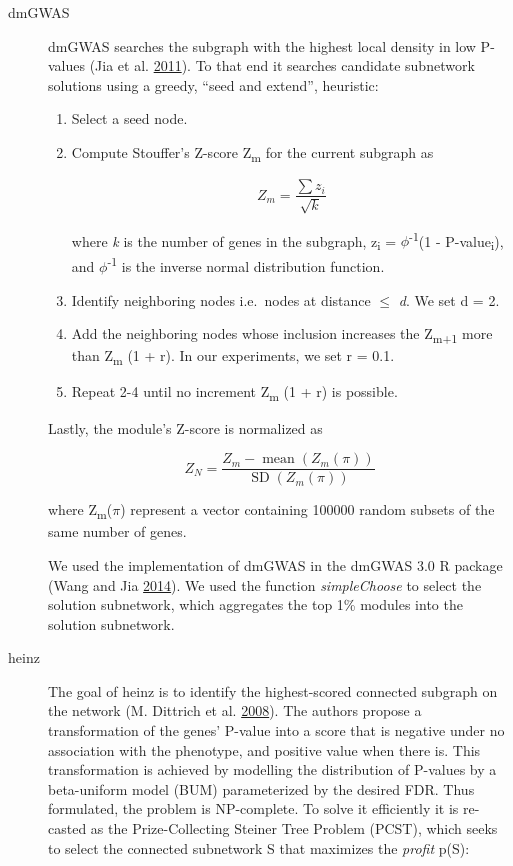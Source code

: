 \documentclass[
  11pt,
]{env/yjiao}
\begin{document}
\begin{description}
\item[dmGWAS]
dmGWAS searches the subgraph with the highest local density in low
P-values (Jia et al. \protect\hyperlink{ref-jia_dmgwas:_2011}{2011}). To that end it searches candidate
subnetwork solutions using a greedy, ``seed and extend'', heuristic:

\begin{enumerate}
\def\labelenumi{\arabic{enumi}.}
\item
  Select a seed node.
\item
  Compute Stouffer's Z-score Z\textsubscript{m} for the current subgraph as

  \[Z_m = \frac{\sum z_i}{\sqrt{k}}\]

  where \emph{k} is the number of genes in the subgraph, z\textsubscript{i} =
  \(\phi\)\textsuperscript{-1}(1 - P-value\textsubscript{i}), and \(\phi\)\textsuperscript{-1} is the inverse normal
  distribution function.
\item
  Identify neighboring nodes i.e.~nodes at distance \(\le\) \emph{d}. We
  set d = 2.
\item
  Add the neighboring nodes whose inclusion increases the Z\textsubscript{m+1}
  more than Z\textsubscript{m} (1 + r). In our experiments, we set r = 0.1.
\item
  Repeat 2-4 until no increment Z\textsubscript{m} (1 + r) is possible.
\end{enumerate}

Lastly, the module's Z-score is normalized as

\[Z_{N}=\frac{Z_{m}-\operatorname{mean}\left(Z_{m}(\pi)\right)}{\operatorname{SD}\left(Z_{m}(\pi)\right)}\]

where Z\textsubscript{m}(\(\pi\)) represent a vector containing 100000 random
subsets of the same number of genes.

We used the implementation of dmGWAS in the dmGWAS 3.0 R package
(Wang and Jia \protect\hyperlink{ref-dmgwas}{2014}). We used the function \emph{simpleChoose} to select the
solution subnetwork, which aggregates the top 1\% modules into the
solution subnetwork.
\item[heinz]
The goal of heinz is to identify the highest-scored connected
subgraph on the network (M. Dittrich et al. \protect\hyperlink{ref-dittrich_identifying_2008}{2008}). The authors
propose a transformation of the genes' P-value into a score that is
negative under no association with the phenotype, and positive value
when there is. This transformation is achieved by modelling the
distribution of P-values by a beta-uniform model (BUM) parameterized
by the desired FDR. Thus formulated, the problem is NP-complete. To
solve it efficiently it is re-casted as the Prize-Collecting Steiner
Tree Problem (PCST), which seeks to select the connected subnetwork
S that maximizes the \emph{profit} p(S):


\end{description}
\end{document}
